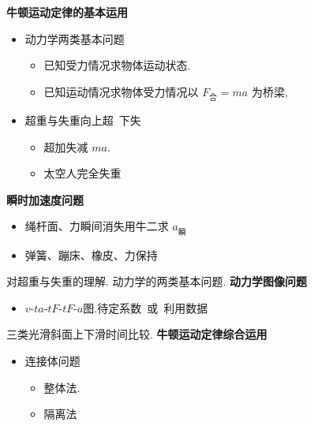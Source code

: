 \textbf{牛顿运动定律的基本运用}
\begin{itemize}
\item 动力学两类基本问题
  \begin{itemize}
  \item 已知受力情况求物体运动状态.
  \item 已知运动情况求物体受力情况\quad 以 $F_{\text{合}}=ma$ 为桥梁,
  \end{itemize}
\end{itemize}
\begin{itemize}
\item 超重与失重\quad 向上超\ 下失
  \begin{itemize}
  \item 超加失减 $ma$.
  \item 太空人完全失重
  \end{itemize}
\end{itemize}
\textbf{瞬时加速度问题}
\begin{itemize}
\item 绳杆面、力瞬间消失\quad 用牛二求 $a_{\text{瞬}}$
\item 弹簧、蹦床、橡皮、力保持
\end{itemize}
对超重与失重的理解.
动力学的两类基本问题.
\textbf{动力学图像问题}
\begin{itemize}
\item $v$-$t$\quad $a$-$t$\quad $F$-$t$\quad $F$-$a$图.\quad 待定系数\ 或\ 利用数据
\end{itemize}
三类光滑斜面上下滑时间比较.
\textbf{牛顿运动定律综合运用}
\begin{itemize}
\item 连接体问题
  \begin{itemize}
  \item 整体法.
  \item 隔离法
  \end{itemize}
\end{itemize}
